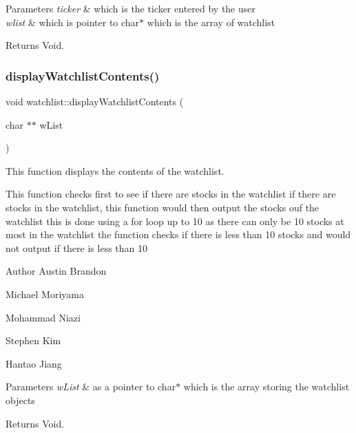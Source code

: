 \begin{DoxyParams}{Parameters}
{\em ticker} & which is the ticker entered by the user \\
\hline
{\em wlist} & which is pointer to char$\ast$ which is the array of watchlist \\
\hline
\end{DoxyParams}
\begin{DoxyReturn}{Returns}
Void. 
\end{DoxyReturn}
\mbox{\label{classwatchlist_a4b3a8998a154b4a394f8e4538f37c497}} 
\subsubsection{\texorpdfstring{display\+Watchlist\+Contents()}{displayWatchlistContents()}}
{\footnotesize\ttfamily void watchlist\+::display\+Watchlist\+Contents (\begin{DoxyParamCaption}\item[{char $\ast$$\ast$}]{w\+List }\end{DoxyParamCaption})}



This function displays the contents of the watchlist. 

This function checks first to see if there are stocks in the watchlist if there are stocks in the watchlist, this function would then output the stocks ouf the watchlist this is done using a for loop up to 10 as there can only be 10 stocks at most in the watchlist the function checks if there is less than 10 stocks and would not output if there is less than 10

\begin{DoxyAuthor}{Author}
Austin Brandon 

Michael Moriyama 

Mohammad Niazi 

Stephen Kim 

Hantao Jiang 
\end{DoxyAuthor}

\begin{DoxyParams}{Parameters}
{\em w\+List} & as a pointer to char$\ast$ which is the array storing the watchlist objects \\
\hline
\end{DoxyParams}
\begin{DoxyReturn}{Returns}
Void. 
\end{DoxyReturn}
\mbox{\label{classwatchlist_ac05cc228f237f6ba3f0235ff454994ce}} 
